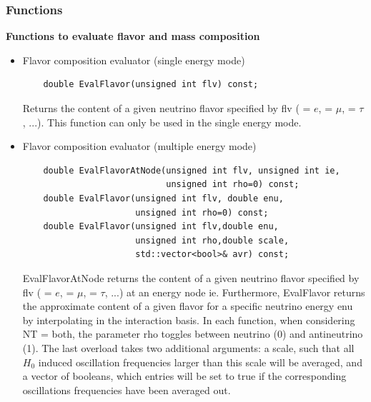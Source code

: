 \documentclass[3p,12pt]{elsarticle}
\newcommand{\ttf}{\ttfamily}
\begin{document}
\subsubsection{Functions}

\textbf{Functions to evaluate flavor and mass composition}

\begin{itemize}
\item Flavor composition evaluator (single energy mode)
  \begin{lstlisting}
    double EvalFlavor(unsigned int flv) const;
  \end{lstlisting}
Returns the content of a given neutrino flavor specified by {\ttfamily
  flv} ({ = $e$}, { = $\mu$}, { =
  $\tau$}, ...). This function can only be used in the single energy
mode. 
\item Flavor composition evaluator (multiple energy mode)
  \begin{lstlisting}
    double EvalFlavorAtNode(unsigned int flv, unsigned int ie, 
                            unsigned int rho=0) const;
    double EvalFlavor(unsigned int flv, double enu,
                      unsigned int rho=0) const;
    double EvalFlavor(unsigned int flv,double enu,
                      unsigned int rho,double scale,
                      std::vector<bool>& avr) const;
  \end{lstlisting}
{\ttfamily EvalFlavorAtNode} returns the content of a given neutrino
flavor specified by {\ttfamily flv} ({ = $e$}, {
  = $\mu$}, { = $\tau$, ...}) at an energy node {\ttfamily
  ie}. Furthermore, {\ttfamily EvalFlavor} returns the approximate
content of a given flavor for a specific neutrino energy  {\ttf enu}
by interpolating in the interaction basis. In each function, when
considering  {\ttf  NT = both}, the parameter {\ttf rho} toggles
between {\ttf neutrino (0)} and {\ttf antineutrino (1)}.
The last overload takes two additional arguments: a {\ttf scale}, such
that all $H_0$ induced oscillation frequencies larger than this scale
will be averaged, and a vector of booleans, which entries will be set to
true if the corresponding oscillations frequencies have been averaged
out.


\end{itemize}
\end{document}
